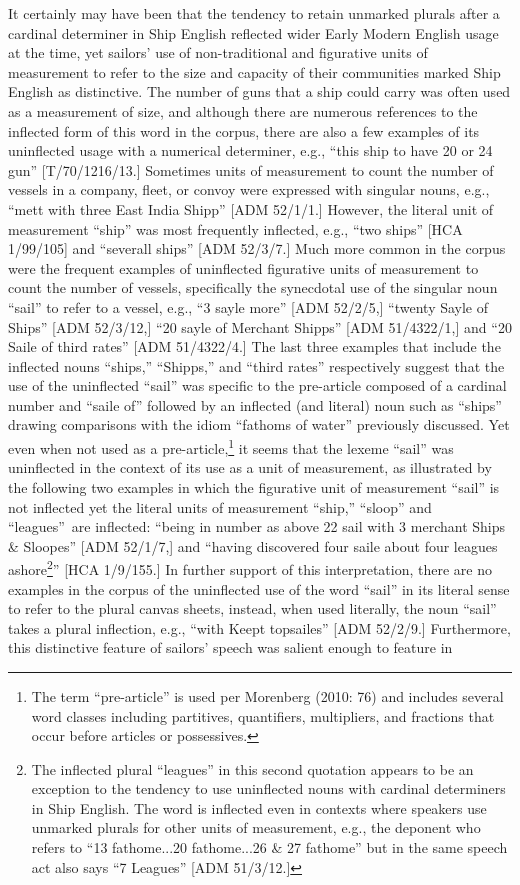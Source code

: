\documentclass[12pt]{article}
\newenvironment{styleStandard}{\renewcommand\baselinestretch{1.0}\setlength\leftskip{0cm}\setlength\rightskip{0cm plus 1fil}\setlength\parindent{0cm}\setlength\parfillskip{0pt plus 1fil}\setlength\parskip{0in plus 1pt}\writerlistparindent\writerlistleftskip\leavevmode\normalfont\normalsize\writerlistlabel\ignorespaces}{\unskip\vspace{0in plus 1pt}\par}
\newcommand\writerlistleftskip{}
\newcommand\writerlistparindent{}
\newcommand\writerlistlabel{}
\begin{document}
\begin{styleStandard}
It certainly may have been that the tendency to retain unmarked plurals after a cardinal determiner in Ship English reflected wider Early Modern English usage at the time, yet sailors’ use of non-traditional and figurative units of measurement to refer to the size and capacity of their communities marked Ship English as distinctive. The number of guns that a ship could carry was often used as a measurement of size, and although there are numerous references to the inflected form of this word in the corpus, there are also a few examples of its uninflected usage with a numerical determiner, e.g., “this ship to have 20 or 24 gun” [T/70/1216/13.] Sometimes units of measurement to count the number of vessels in a company, fleet, or convoy were expressed with singular nouns, e.g., “mett with three East India Shipp” [ADM 52/1/1.] However, the literal unit of measurement “ship” was most frequently inflected, e.g., “two ships” [HCA 1/99/105] and “severall ships” [ADM 52/3/7.] Much more common in the corpus were the frequent examples of uninflected figurative units of measurement to count the number of vessels, specifically the synecdotal use of the singular noun “sail” to refer to a vessel, e.g., “3 sayle more” [ADM 52/2/5,] “twenty Sayle of Ships” [ADM 52/3/12,] “20 sayle of Merchant Shipps” [ADM 51/4322/1,] and “20 Saile of third rates” [ADM 51/4322/4.] The last three examples that include the inflected nouns “ships,” “Shipps,” and “third rates” respectively suggest that the use of the uninflected “sail” was specific to the pre-article composed of a cardinal number and “saile of” followed by an inflected (and literal) noun such as “ships” drawing comparisons with the idiom “fathoms of water” previously discussed. Yet even when not used as a pre-article,\footnote{ The term “pre-article” is used per Morenberg (2010: 76) and includes several word classes including partitives, quantifiers, multipliers, and fractions that occur before articles or possessives.} it seems that the lexeme “sail” was uninflected in the context of its use as a unit of measurement, as illustrated by the following two examples in which the figurative unit of measurement “sail” is not inflected yet the literal units of measurement “ship,” “sloop” and “leagues”~are inflected: “being in number as above 22 sail with 3 merchant Ships \& Sloopes” [ADM 52/1/7,] and “having discovered four saile about four leagues ashore\footnote{ The inflected plural “leagues” in this second quotation appears to be an exception to the tendency to use uninflected nouns with cardinal determiners in Ship English. The word is inflected even in contexts where speakers use unmarked plurals for other units of measurement, e.g., the deponent who refers to “13 fathome...20 fathome...26 \& 27 fathome” but in the same speech act also says “7 Leagues” [ADM 51/3/12.]}” [HCA 1/9/155.] In further support of this interpretation, there are no examples in the corpus of the uninflected use of the word “sail” in its literal sense to refer to the plural canvas sheets, instead, when used literally, the noun “sail” takes a plural inflection, e.g., “with Keept topsailes” [ADM 52/2/9.] Furthermore, this distinctive feature of sailors’ speech was salient enough to feature in 
\end{styleStandard}
\end{document}
